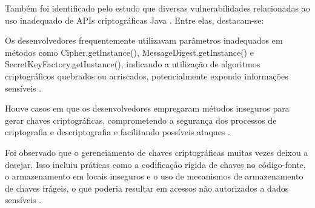 
Também foi identificado pelo estudo que diversas vulnerabilidades relacionadas ao uso inadequado de APIs criptográficas Java \cite{api_misuses_zhang}. Entre elas, destacam-se:

Os desenvolvedores frequentemente utilizavam parâmetros inadequados em métodos como Cipher.getInstance(), MessageDigest.getInstance() e SecretKeyFactory.getInstance(), indicando a utilização de algoritmos criptográficos quebrados ou arriscados, potencialmente expondo informações sensíveis \cite{api_misuses_zhang}.

Houve casos em que os desenvolvedores empregaram métodos inseguros para gerar chaves criptográficas, comprometendo a segurança dos processos de criptografia e descriptografia e facilitando possíveis ataques \cite{api_misuses_zhang}.

Foi observado que o gerenciamento de chaves criptográficas muitas vezes deixou a desejar. Isso incluiu práticas como a codificação rígida de chaves no código-fonte, o armazenamento em locais inseguros e o uso de mecanismos de armazenamento de chaves frágeis, o que poderia resultar em acessos não autorizados a dados sensíveis \cite{api_misuses_zhang}.

